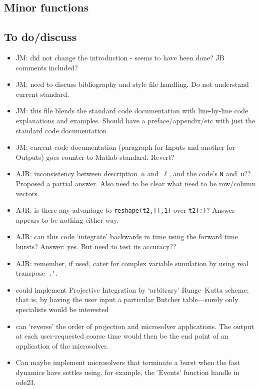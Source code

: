 





\subsection{Minor functions}
\label{sec:extras}







\begin{body}
\subsection{To do/discuss}
\begin{itemize}
\item JM: did not change the introduction - seems to have been done? JB comments included?
\item JM: need to discuss bibliography and style file handling. Do not understand current standard.
\item JM: this file blends the standard code documentation with line-by-line code explanations and examples. Should have a preface/appendix/etc with just the standard code documentation
\item JM: current code documentation (paragraph for Inputs and another for Outputs) goes counter to Matlab standard. Revert?
\item AJR: inconsistency between description~\(n\) and~\(\ell\), and the code's \verb|N| and~\verb|n|??  Proposed a partial answer.  Also need to be clear what need to be row/column vectors.
\item AJR: is there any advantage to \verb|reshape(t2,[],1)| over \verb|t2(:)|?  Answer appears to be nothing either way.
\item AJR: can this code `integrate' backwards in time using the forward time bursts? Answer: yes. But need to test its accuracy??
\item AJR: remember, if used, cater for complex variable simulation by using real transpose~\verb|.'|.
\item could implement Projective Integration by `arbitrary' Runge--Kutta scheme; that is, by having the user input a particular Butcher table---surely only specialists would be interested
\item can `reverse' the order of projection and microsolver applications.
The output at each user-requested coarse time would then be the end point of an application of the microsolver.
\item Can maybe implement microsolvers that terminate a burst when the fast dynamics have settles using, for example, the 'Events' function handle in ode23. 
\end{itemize}

\end{body}


